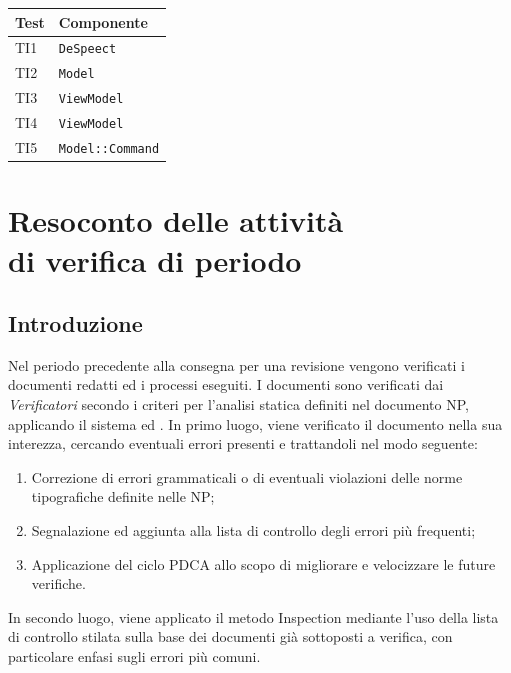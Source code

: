\documentclass[openany,12pt,a4paper]{report}
\begin{document}
\begin{longtable}{| p{3cm} |p{6cm}|}
	\hline
	\textbf{Test} & \textbf{Componente}\\
	\hline
	\endhead
	TI1&\verb|DeSpeect|
	\\[1em]	
	\hline	
	TI2&\verb|Model|
	\\[1em]	
	\hline	
	TI3&\verb|ViewModel|
	\\[1em]	
	\hline	
	TI4&\verb|ViewModel|
	\\[1em]	
	\hline	
	TI5&\verb|Model::Command|
	\\[1em]
	\hline
\end{longtable}


\chapter{Resoconto delle attività \\ di verifica di periodo}

\section{Introduzione}

Nel periodo precedente alla consegna per una revisione vengono verificati i documenti redatti ed i processi eseguiti. I documenti sono verificati dai \textit{Verificatori} secondo i criteri per l'analisi statica definiti nel documento NP, applicando il sistema  ed . In primo luogo, viene verificato il documento nella sua interezza, cercando eventuali errori presenti e trattandoli nel modo seguente:

\begin{enumerate}
	\item Correzione di errori grammaticali o di eventuali violazioni delle norme tipografiche definite nelle NP;
	\item Segnalazione ed aggiunta alla lista di controllo degli errori più frequenti;
	\item Applicazione del ciclo PDCA allo scopo di migliorare e velocizzare le future verifiche.
\end{enumerate}

\noindent In secondo luogo, viene applicato il metodo Inspection mediante l'uso della lista di controllo stilata sulla base dei documenti già sottoposti a verifica, con particolare enfasi sugli errori più comuni.
\end{document}
